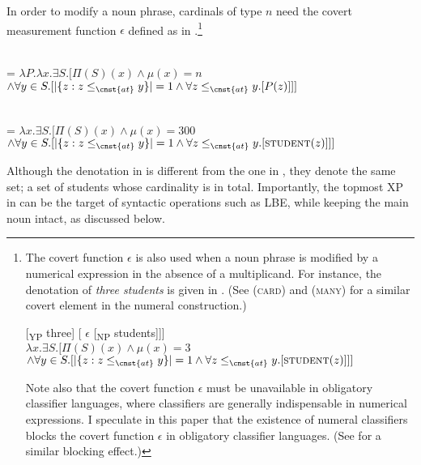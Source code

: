 \documentclass[output=paper]{langscibook}
\begin{document}
\noindent In order to modify a noun phrase, cardinals of type $n$ need the covert measurement function $\epsilon$ defined as in .\footnote{The covert function $\epsilon$ is also used when a noun phrase is modified by a numerical expression in the absence of a multiplicand. For instance, the denotation of \textit{three students} is given in . (See \citealt{Scontras2014} (\textsc{card}) and \citealt{Champollion2017} (\textsc{many}) for a similar covert element in the numeral construction.)

\ea
\ea {[} [\textsubscript{YP} three] [ $\epsilon$ [\textsubscript{NP} students]]]
\ex\label{tat:simple}  \\
$\lambda x.\exists S.[\Pi(S)(x) \wedge \mu(x) = 3$\\
\hspace*{\fill}$\wedge \forall y \in S.[\vert\{z: z\leq_{\cnst{at}}y\}\vert = 1 \wedge \forall z\leq_{\cnst{at}}y.[\textsc{student}(z)]]]$
\z\z

\noindent Note also that the covert function $\epsilon$ must be unavailable in obligatory classifier languages, where classifiers are generally indispensable in numerical expressions. I speculate in this paper that the existence of numeral classifiers blocks the covert function $\epsilon$ in obligatory classifier languages. (See \citealt{Chierchia1998} for a similar blocking effect.)
}

\ea
\ea\label{tat:ep}
\sib{$\epsilon$} \\
= $\lambda P.\lambda x.\exists S.[\Pi(S)(x) \wedge \mu(x) = n$\\
\hspace*{\fill}$\wedge \forall y \in S.[\vert\{z: z\leq_{\cnst{at}}y\}\vert = 1 \wedge \forall z\leq_{\cnst{at}}y.[P(z)]]]$

\ex\label{tat:ep2}
\\
 = $\lambda x.\exists S.[\Pi(S)(x) \wedge \mu(x) = 300$\\
\hspace*{\fill}$\wedge \forall y \in S.[\vert\{z: z\leq_{\cnst{at}}y\}\vert = 1 \wedge \forall z\leq_{\cnst{at}}y.[\textsc{student}(z)]]]$
\z\z

\noindent Although the denotation in  is different from the one in , they denote the same set; a set of students whose cardinality is  in total. Importantly, the topmost XP in  can be the target of syntactic operations such as LBE, while keeping the main noun intact, as discussed below.
\end{document}
